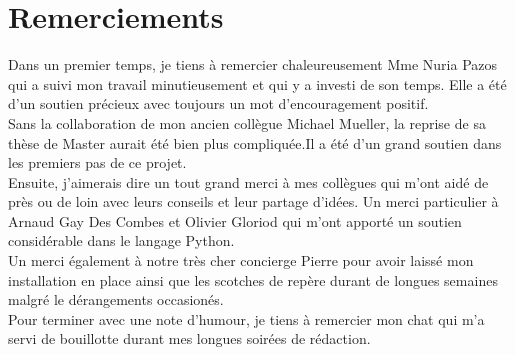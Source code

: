 \chapter{Remerciements}
Dans un premier temps, je tiens à remercier chaleureusement Mme Nuria Pazos qui a suivi mon travail minutieusement et qui y a investi de son temps. Elle a été d'un soutien précieux avec toujours un mot d'encouragement positif. 
\\[0.2in]

Sans la collaboration de mon ancien collègue Michael Mueller, la reprise de sa thèse de Master aurait été bien plus compliquée.Il a été d'un grand soutien dans les premiers pas de ce projet. 
\\[0.2in]

Ensuite, j'aimerais dire un tout grand merci à mes collègues qui m'ont aidé de près ou de loin avec leurs conseils et leur partage d'idées. Un merci particulier à Arnaud Gay Des Combes et Olivier Gloriod qui m'ont apporté un soutien considérable dans le langage Python. 
\\[0.2in]

Un merci également à notre très cher concierge Pierre pour avoir laissé mon installation en place ainsi que les scotches de repère durant de longues semaines malgré le dérangements occasionés.
\\[0.2in]

Pour terminer avec une note d'humour, je tiens à remercier mon chat qui m'a servi de bouillotte durant mes longues soirées de rédaction. 


